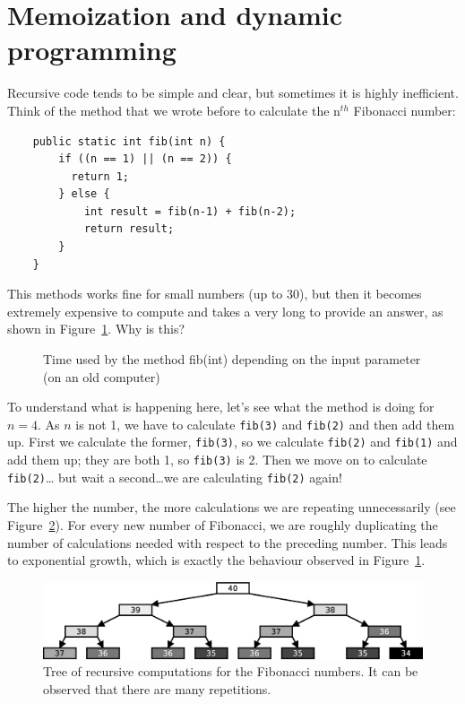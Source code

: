 \vspace{1cm}

\section{Memoization and dynamic programming}
\label{sec:memo-dynam-progr}

Recursive code tends to be simple and clear, but sometimes it is
highly inefficient. Think of the method that we wrote before to
calculate the n$^{th}$ Fibonacci number: 

\begin{verbatim}
    public static int fib(int n) {
        if ((n == 1) || (n == 2)) {
          return 1; 
        } else {
            int result = fib(n-1) + fib(n-2);
            return result;
        }
    }
\end{verbatim}

This methods works fine for small numbers (up to 30), but then it
becomes extremely expensive to compute and takes a very long to
provide an answer, as shown in Figure~\ref{fig:fibotime}. Why is this? 

\begin{figure}[hbtp]
  \centering
  
  \caption{Time used by the method fib(int) depending on the input
    parameter (on an old computer)}
  \label{fig:fibotime}
\end{figure}

To understand what is happening here, let's see what the method is
doing for $n = 4$. As $n$ is not 1, 
we have to calculate \verb+fib(3)+ and \verb+fib(2)+
and then add them up. First we calculate the former, \verb+fib(3)+, so
we calculate \verb+fib(2)+ and \verb+fib(1)+ and add them up; they are both 1, so
\verb+fib(3)+ is 2. Then we move on to calculate \verb+fib(2)+\ldots
but wait a second\ldots we are calculating \verb+fib(2)+ again! 

The higher the number, the more calculations we are repeating
unnecessarily (see Figure~\ref{fig:fibotree}). For every new number of
Fibonacci, we are roughly duplicating the number of calculations
needed with respect to the preceding number. This leads to exponential
growth, which is exactly the behaviour observed in
Figure~\ref{fig:fibotime}. 

\begin{figure}[hbtp]
  \centering
  \includegraphics[width=\textwidth]{gfx/factorial-tree}
  \caption{Tree of recursive computations for the Fibonacci numbers. It can be observed that there are many repetitions. }
  \label{fig:fibotree}
\end{figure}

